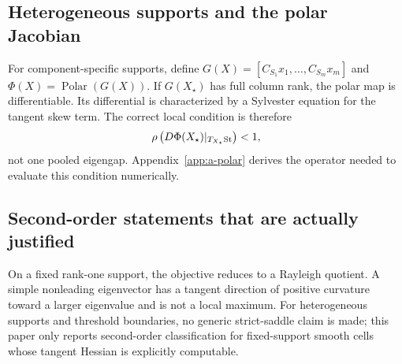 \subsection{Heterogeneous supports and the polar Jacobian}
For component-specific supports, define $G(X)=[C_{S_1}x_1,\ldots,C_{S_m}x_m]$ and $\Phi(X)=\operatorname{Polar}(G(X))$. If $G(X_\star)$ has full column rank, the polar map is differentiable. Its differential is characterized by a Sylvester equation for the tangent skew term. The correct local condition is therefore
\[
\rho\left(D\Phi(X_\star)|_{T_{X_\star}\mathrm{St}}\right)<1,
\]
not one pooled eigengap. Appendix~\ref{app:a-polar} derives the operator needed to evaluate this condition numerically.

\subsection{Second-order statements that are actually justified}
On a fixed rank-one support, the objective reduces to a Rayleigh quotient. A simple nonleading eigenvector has a tangent direction of positive curvature toward a larger eigenvalue and is not a local maximum. For heterogeneous supports and threshold boundaries, no generic strict-saddle claim is made; this paper only reports second-order classification for fixed-support smooth cells whose tangent Hessian is explicitly computable.




